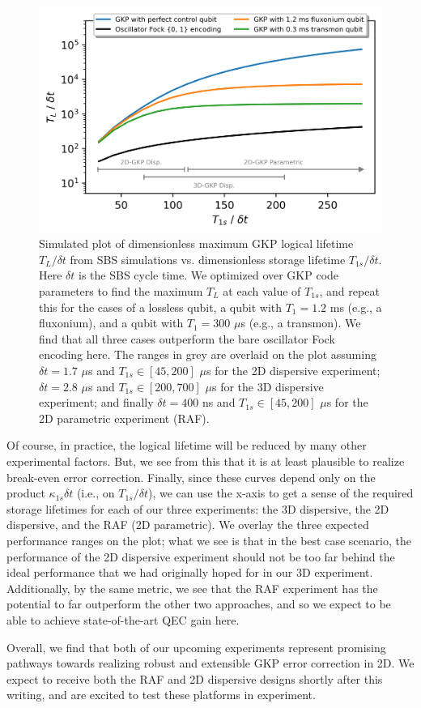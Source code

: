 \begin{figure}[t]
    \centering
    \includegraphics[width=0.8\linewidth]{Figures/5/2D_vs_3D_SBS_Comparison.png}
    \caption[Simulated plot of GKP logical lifetime vs. storage lifetime to determine feasibility for the GKP error correction in 2D.]{Simulated plot of dimensionless maximum GKP logical lifetime $T_L/\delta t$ from SBS simulations vs. dimensionless storage lifetime $T_{1s}/\delta t$. Here $\delta t$ is the SBS cycle time. We optimized over GKP code parameters to find the maximum $T_L$ at each value of $T_{1s}$, and repeat this for the cases of a lossless qubit, a qubit with $T_1 = 1.2$ ms (e.g., a fluxonium), and a qubit with $T_1 = 300$ $\mu$s (e.g., a transmon). We find that all three cases outperform the bare oscillator Fock encoding here. The ranges in grey are overlaid on the plot assuming $\delta t = 1.7$ $\mu$s and $T_{1s} \in [45, 200]$ $\mu$s for the 2D dispersive experiment; $\delta t = 2.8$ $\mu$s and $T_{1s} \in [200, 700]$ $\mu$s for the 3D dispersive experiment; and finally $\delta t = 400$ ns and $T_{1s} \in [45, 200]$ $\mu$s for the 2D parametric experiment (RAF).}
    \label{fig:2D_vs_3D_SBS_Comparison}
\end{figure}

\noindent Of course, in practice, the logical lifetime will be reduced by many other experimental factors. But, we see from this that it is at least plausible to realize break-even error correction. Finally, since these curves depend only on the product $\kappa_{1s}\delta t$ (i.e., on $T_{1s}/\delta t$), we can use the x-axis to get a sense of the required storage lifetimes for each of our three experiments: the 3D dispersive, the 2D dispersive, and the RAF (2D parametric). We overlay the three expected performance ranges on the plot; what we see is that in the best case scenario, the performance of the 2D dispersive experiment should not be too far behind the ideal performance that we had originally hoped for in our 3D experiment. Additionally, by the same metric, we see that the RAF experiment has the potential to far outperform the other two approaches, and so we expect to be able to achieve state-of-the-art QEC gain here.

Overall, we find that both of our upcoming experiments represent promising pathways towards realizing robust and extensible GKP error correction in 2D. We expect to receive both the RAF and 2D dispersive designs shortly after this writing, and are excited to test these platforms in experiment.  

\printbibliography[heading=subbibliography, title = References]